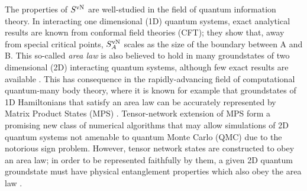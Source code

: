 \documentclass[prl,aps,twocolumn,floatfix,amsmath,amssymb,superscriptaddress,tightenlines]{revtex4}
\begin{document}
The properties of $S^{ \rm vN}$ are well-studied in the field of quantum information theory.
In interacting one dimensional (1D) quantum systems, exact analytical results are known from conformal
field theories (CFT); they show that, away from special critical points,
$S^{ \rm vN}_A$ scales as the size of the boundary between A and B.
This so-called {\it area law} \cite{Shredder} is also believed to hold in many
groundstates of two dimensional (2D) interacting quantum systems,
although few exact results are available \cite{ALreview}.  This has 
consequence in the
rapidly-advancing field of computational quantum-many body theory, where
it is known for example that groundstates of 1D Hamiltonians that satisfy an area law
can be accurately represented by Matrix Product States (MPS) \cite{MPS_DMRG}.
Tensor-network extension of MPS form a promising new class of numerical algorithms \cite{PEPS1} 
that may allow simulations of 2D quantum systems not amenable to quantum Monte Carlo (QMC) due to
the notorious sign problem.  However, tensor network states
are constructed to obey an area law; in order to be represented faithfully
by them, a given 2D quantum groundstate must have physical entanglement
properties which also obey the area law \cite{ALreview}.


\end{document}
